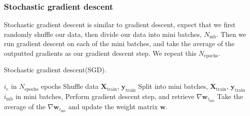 \subsubsection{Stochastic gradient descent}
Stochastic gradient descent is similar to gradient descent, expect that we first randomly shuffle our data, then divide our data into mini batches, $N_\mathrm{mb}$. Then we run gradient descent on each of the mini batches, and take the average of the outputted gradients as our gradient descent step. We repeat this $N_\mathrm{epochs}$.
\begin{algorithm}[H]
    \caption{Stochastic gradient descent(SGD).}
    \label{alg:sgd}
    \begin{algorithmic}[1]
        \For $i_e$ in $N_\mathrm{epochs}$ epochs
            \State Shuffle data $\bm{X}_\mathrm{train}$, $\bm{y}_\mathrm{train}$
            \State Split into mini batches, $\bm{X}_\mathrm{train}$, $\bm{y}_\mathrm{train}$
            \For $i_\mathrm{mb}$ in mini batches,
                \State Perform gradient descent step, and retrieve $\nabla\bm{w}_{i_\mathrm{mb}}$
            \EndFor
            \State Take the average of the $\nabla\bm{w}_{i_\mathrm{mb}}$ and update the weight matrix $\bm{w}$.
        \EndFor
    \end{algorithmic}
\end{algorithm}




